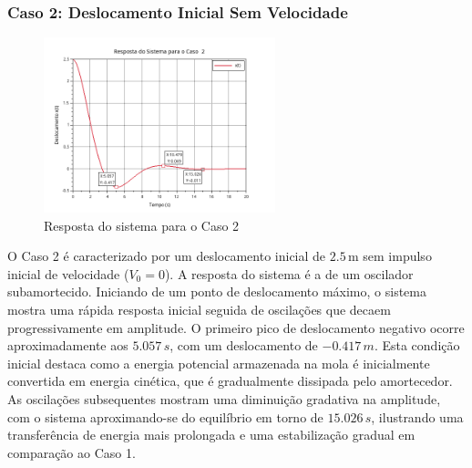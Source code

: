 \documentclass{article}
\begin{document}
\subsubsection{Caso 2: Deslocamento Inicial Sem Velocidade}
\begin{figure}[H]
    \centering
    \includegraphics[width=0.6\textwidth]{atividades/1-atividade/assets/caso2.png}
    \caption{Resposta do sistema para o Caso 2}
\end{figure}
O Caso 2 é caracterizado por um deslocamento inicial de \(2.5 \, \text{m}\) sem impulso inicial de velocidade (\(V_0 = 0\)). A resposta do sistema é a de um oscilador subamortecido. Iniciando de um ponto de deslocamento máximo, o sistema mostra uma rápida resposta inicial seguida de oscilações que decaem progressivamente em amplitude. O primeiro pico de deslocamento negativo ocorre aproximadamente aos \(5.057 \, s\), com um deslocamento de \(-0.417 \, m\). Esta condição inicial destaca como a energia potencial armazenada na mola é inicialmente convertida em energia cinética, que é gradualmente dissipada pelo amortecedor. As oscilações subsequentes mostram uma diminuição gradativa na amplitude, com o sistema aproximando-se do equilíbrio em torno de \(15.026 \, s\), ilustrando uma transferência de energia mais prolongada e uma estabilização gradual em comparação ao Caso 1.
\end{document}
